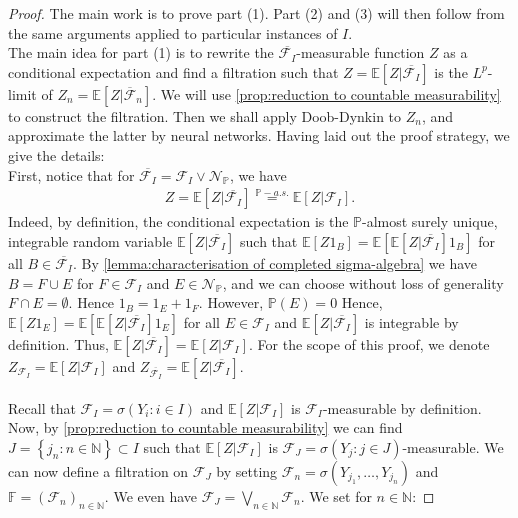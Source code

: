 \documentclass[11pt,a4paper,twoside,openany]{report}
\theoremstyle{plain} %
\theoremstyle{definition} %
\theoremstyle{remark} %
\begin{document}
\begin{proof}   
The main work is to prove part (1). Part (2) and (3) will then follow from the same arguments applied to particular instances of \(I\). \\
The main idea for part (1) is to rewrite the \(\overline{\mathcal{F}_I}\)-measurable function \(Z\) as a conditional expectation and find a filtration such that \(Z=\mathbb{E}[Z|\overline{\mathcal{F}_I}]\) is the \(L^p\)-limit of \(Z_n=\mathbb{E}[Z|\overline{\mathcal{F}}_n]\). We will use \cref{prop:reduction to countable measurability} to construct the filtration. Then we shall apply Doob-Dynkin to \(Z_n\), and approximate the latter by neural networks. Having laid out the proof strategy, we give the details:\\
First, notice that for \(\overline{\mathcal{F}_I}=\mathcal{F}_I\vee\mathcal{N}_{\mathbb{P}}\), we have
\begin{align}
    Z=\mathbb{E}[Z|\overline{\mathcal{F}_I}]\overset{\mathbb{P}-a.s.}{=}\mathbb{E}[Z|\mathcal{F}_I]. 
\end{align}
Indeed, by definition, the conditional expectation is the \(\mathbb{P}\)-almost surely unique, integrable random variable \(\mathbb{E}[Z|\overline{\mathcal{F}_I}]\) such that \(\mathbb{E}[Z1_B]=\mathbb{E}[\mathbb{E}[Z|\overline{\mathcal{F}_I}]1_B]\) for all \(B\in\overline{\mathcal{F}_I}\). By \cref{lemma:characterisation of completed sigma-algebra} we have \(B=F\cup E\) for \(F\in\mathcal{F}_I\) and \(E\in\mathcal{N}_{\mathbb{P}}\), and we can choose without loss of generality \(F\cap E=\emptyset\). Hence \(1_{B}=1_E+1_F\). However, \(\mathbb{P}(E)=0\) Hence, \(\mathbb{E}[Z1_E]=\mathbb{E}[\mathbb{E}[Z|\overline{\mathcal{F}_I}]1_E]\) for all \(E\in\mathcal{F}_I\) and \(\mathbb{E}[Z|\overline{\mathcal{F}_I}]\) is integrable by definition. Thus, \(\mathbb{E}[Z|\overline{\mathcal{F}_I}]=\mathbb{E}[Z|\mathcal{F}_I]\). For the scope of this proof, we denote \(Z_{\mathcal{F}_I}=\mathbb{E}[Z|\mathcal{F}_I]\) and \(Z_{\overline{\mathcal{F}_I}}=\mathbb{E}[Z|\overline{\mathcal{F}_I}]\).
\\\\
Recall that \(\mathcal{F}_I=\sigma(Y_i:i\in I)\) and \(\mathbb{E}[Z|\mathcal{F}_I]\) is \(\mathcal{F}_I\)-measurable by definition. 
Now, by \cref{prop:reduction to countable measurability} we can find \(J= \left\{j_n:n\in\mathbb{N}\right\}\subset I\) such that \(\mathbb{E}[Z|\mathcal{F}_I]\) is \(\mathcal{F}_J=\sigma(Y_j:j\in J)\)-measurable. We can now define a filtration on \(\mathcal{F}_J\) by setting \(\mathcal{F}_n=\sigma(Y_{j_1},\dots,Y_{j_n})\) and \(\mathbb{F}=(\mathcal{F}_{n})_{n\in\mathbb{N}}\). We even have \(\mathcal{F}_J=\bigvee_{n\in\mathbb{N}}\mathcal{F}_n\). We set for \(n\in\mathbb{N}\):

\end{proof}
\end{document}
